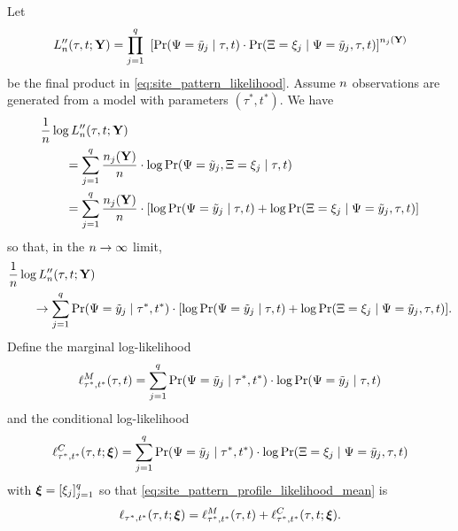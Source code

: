 Let
\[
L_n''(\tau, t; \mathbf{Y}) = \prod_{j=1}^{q} \ \left[\Pr(\Psi=\tilde{y}_j \mid \tau, t) \cdot \Pr(\Xi=\xi_j \mid \Psi=\tilde{y}_j, \tau, t)\right] ^{n_j(\mathbf{Y})}
\]
be the final product in \eqref{eq:site_pattern_likelihood}.
Assume $n$ observations are generated from a model with parameters $(\tau^*, t^*)$.
We have
\begin{equation*}
\begin{split}
&    \frac{1}{n} \log L_n''(\tau, t; \mathbf{Y}) \\
&\qquad = \sum_{j=1}^q \frac{n_j(\mathbf{Y})}{n}\cdot  \log \Pr(\Psi=\tilde{y}_j, \Xi=\xi_j \mid \tau, t) \\
&\qquad = \sum_{j=1}^q \frac{n_j(\mathbf{Y})}{n}\cdot [\log \Pr(\Psi=\tilde{y}_j \mid \tau, t) +
            \log \Pr(\Xi=\xi_j \mid \Psi=\tilde{y}_j , \tau, t)]
\end{split}
\end{equation*}
so that, in the $n\rightarrow\infty$ limit,
\begin{equation}
\begin{split}
&    \frac{1}{n} \log L_n''(\tau, t; \mathbf{Y}) \\
&\qquad \rightarrow \sum_{j=1}^q \Pr(\Psi=\tilde{y}_j \mid \tau^*, t^*) \cdot [\log \Pr(\Psi=\tilde{y}_j \mid \tau, t) + \log \Pr(\Xi=\xi_j \mid \Psi=\tilde{y}_j , \tau, t)]. \label{eq:site_pattern_profile_likelihood_mean}
\end{split}
\end{equation}
Define the marginal log-likelihood
\[
\ell^M_{\tau^*,t^*}(\tau,t) = \sum_{j=1}^q \Pr(\Psi=\tilde{y}_j \mid \tau^*, t^*)\cdot\log \Pr(\Psi=\tilde{y}_j \mid \tau, t)
\]
and the conditional log-likelihood
\[
\ell^C_{\tau^*,t^*}(\tau, t; \boldsymbol\xi) = \sum_{j=1}^q \Pr(\Psi=\tilde{y}_j \mid \tau^*, t^*)\cdot\log \Pr(\Xi=\xi_j \mid \Psi = \tilde{y}_j, \tau, t)
\]
with $\boldsymbol\xi = [\xi_j]_{j=1}^q$ so that \eqref{eq:site_pattern_profile_likelihood_mean} is
\begin{equation}
    \label{eq:log_likelihood_simplified}
    \ell_{\tau^*,t^*}(\tau, t; \boldsymbol\xi) = \ell^M_{\tau^*,t^*}(\tau,t) + \ell^C_{\tau^*,t^*}(\tau, t; \boldsymbol\xi).
\end{equation}

